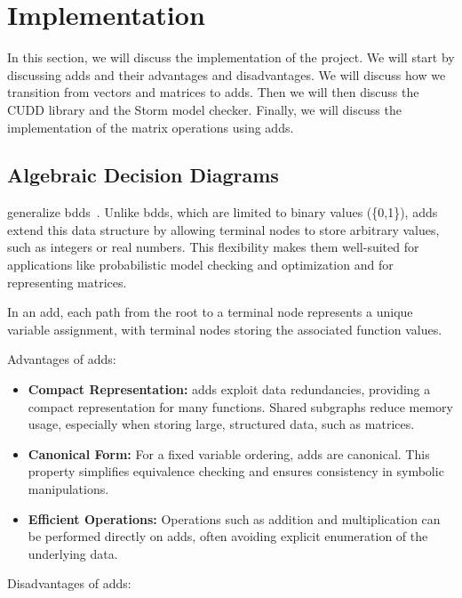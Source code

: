 \section{Implementation}\label{sec:implementation}
In this section, we will discuss the implementation of the project.
We will start by discussing \glspl{add} and their advantages and disadvantages.
We will discuss how we transition from vectors and matrices to \glspl{add}.
Then we will then discuss the CUDD library and the Storm model checker.
Finally, we will discuss the implementation of the matrix operations using \glspl{add}.

\subsection{Algebraic Decision Diagrams}\label{subsec:algebraic-decision-diagrams}
 generalize \glspl{bdd}~\cite{bahar1997algebric}.
Unlike \glspl{bdd}, which are limited to binary values (\{0,1\}), \glspl{add} extend this data structure by allowing terminal nodes to store arbitrary values, such as integers or real numbers.
This flexibility makes them well-suited for applications like probabilistic model checking and optimization and for representing matrices.

In an \gls{add}, each path from the root to a terminal node represents a unique variable assignment, with terminal nodes storing the associated function values.

Advantages of \glspl{add}:

\begin{itemize}
    \item \textbf{Compact Representation:} \glspl{add} exploit data redundancies, providing a compact representation for many functions.
    Shared subgraphs reduce memory usage, especially when storing large, structured data, such as matrices.
    \item \textbf{Canonical Form:} For a fixed variable ordering, \glspl{add} are canonical.
    This property simplifies equivalence checking and ensures consistency in symbolic manipulations.
    \item \textbf{Efficient Operations:} Operations such as addition and multiplication can be performed directly on \glspl{add}, often avoiding explicit enumeration of the underlying data.
\end{itemize}


Disadvantages of \glspl{add}:

